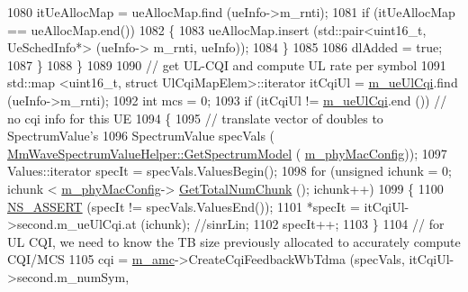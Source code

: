 \begin{DoxyCode}
1080                                 itUeAllocMap = ueAllocMap.find (ueInfo->m\_rnti);
1081                                 \textcolor{keywordflow}{if} (itUeAllocMap == ueAllocMap.end())
1082                                 \{
1083                                         ueAllocMap.insert (std::pair<uint16\_t, UeSchedInfo*> (ueInfo->
      m\_rnti, ueInfo));
1084                                 \}
1085 
1086                                 dlAdded = \textcolor{keyword}{true};
1087                         \}
1088                 \}
1089 
1090                 \textcolor{comment}{// get UL-CQI and compute UL rate per symbol}
1091                 std::map <uint16\_t, struct UlCqiMapElem>::iterator itCqiUl = 
      \hyperlink{classns3_1_1MmWaveFlexTtiMaxRateMacScheduler_a6f9a468f0c48b60d9893fed1410d18cd}{m\_ueUlCqi}.find (ueInfo->m\_rnti);
1092                 \textcolor{keywordtype}{int} mcs = 0;
1093                 \textcolor{keywordflow}{if} (itCqiUl != \hyperlink{classns3_1_1MmWaveFlexTtiMaxRateMacScheduler_a6f9a468f0c48b60d9893fed1410d18cd}{m\_ueUlCqi}.end ()) \textcolor{comment}{// no cqi info for this UE}
1094                 \{
1095                         \textcolor{comment}{// translate vector of doubles to SpectrumValue's}
1096                         SpectrumValue specVals (
      \hyperlink{classns3_1_1MmWaveSpectrumValueHelper_a23fc6693b28bb565a97768b536225b58}{MmWaveSpectrumValueHelper::GetSpectrumModel} (
      \hyperlink{classns3_1_1MmWaveMacScheduler_a24d7af4971d2e500fe543cefbafa2fd9}{m\_phyMacConfig}));
1097                         Values::iterator specIt = specVals.ValuesBegin();
1098                         \textcolor{keywordflow}{for} (\textcolor{keywordtype}{unsigned} ichunk = 0; ichunk < \hyperlink{classns3_1_1MmWaveMacScheduler_a24d7af4971d2e500fe543cefbafa2fd9}{m\_phyMacConfig}->
      \hyperlink{classns3_1_1MmWavePhyMacCommon_a97e82c809a351fea9d5058ac1bb4c3c6}{GetTotalNumChunk} (); ichunk++)
1099                         \{
1100                                 \hyperlink{assert_8h_a6dccdb0de9b252f60088ce281c49d052}{NS\_ASSERT} (specIt != specVals.ValuesEnd());
1101                                 *specIt = itCqiUl->second.m\_ueUlCqi.at (ichunk); \textcolor{comment}{//sinrLin;}
1102                                 specIt++;
1103                         \}
1104                         \textcolor{comment}{// for UL CQI, we need to know the TB size previously allocated to accurately
       compute CQI/MCS}
1105                         cqi = \hyperlink{classns3_1_1MmWaveFlexTtiMaxRateMacScheduler_a8a84d69426586fddd45abe7174da607d}{m\_amc}->CreateCqiFeedbackWbTdma (specVals, itCqiUl->second.m\_numSym, 

\end{DoxyCode}
